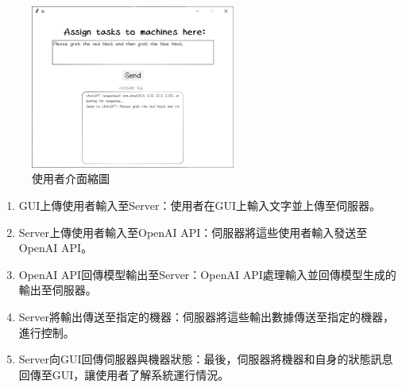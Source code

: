 \documentclass[class=NCU_thesis, crop=false]{standalone}
\begin{document}
\begin{figure}[h]
    \centering
    \includegraphics[width=0.6\textwidth]{figures/GUI.png}
    \caption{使用者介面縮圖}
\end{figure}
\newpage
\begin{enumerate}
    \item GUI上傳使用者輸入至Server：使用者在GUI上輸入文字並上傳至伺服器。
    \item Server上傳使用者輸入至OpenAI API：伺服器將這些使用者輸入發送至OpenAI API。
    \item OpenAI API回傳模型輸出至Server：OpenAI API處理輸入並回傳模型生成的輸出至伺服器。
    \item Server將輸出傳送至指定的機器：伺服器將這些輸出數據傳送至指定的機器，進行控制。
    \item Server向GUI回傳伺服器與機器狀態：最後，伺服器將機器和自身的狀態訊息回傳至GUI，讓使用者了解系統運行情況。
\end{enumerate}
\end{document}
